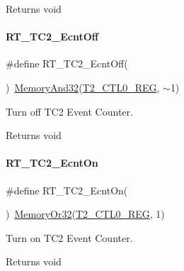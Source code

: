 \begin{DoxyReturn}{Returns}
void 
\end{DoxyReturn}
\mbox{\label{a00047_af77e205baae8e267fda5374c167ab76c}} 
\paragraph{\texorpdfstring{R\+T\+\_\+\+T\+C2\+\_\+\+Ecnt\+Off}{RT\_TC2\_EcntOff}}
{\footnotesize\ttfamily \#define R\+T\+\_\+\+T\+C2\+\_\+\+Ecnt\+Off(\begin{DoxyParamCaption}{ }\end{DoxyParamCaption})~\mbox{\hyperlink{a00020_ad87cedffcaadc51db22594fce55173d4}{Memory\+And32}}(\mbox{\hyperlink{a00020_adadaa0ab1ebbd7ba9b70dfd24c3ed44daf2e9deb36631241181cbf09e8d959475}{T2\+\_\+\+C\+T\+L0\+\_\+\+R\+EG}}, $\sim$1)}



Turn off T\+C2 Event Counter. 

\begin{DoxyReturn}{Returns}
void 
\end{DoxyReturn}
\mbox{\label{a00047_a261544e2cbdbdeee0d22734b29827cd2}} 
\paragraph{\texorpdfstring{R\+T\+\_\+\+T\+C2\+\_\+\+Ecnt\+On}{RT\_TC2\_EcntOn}}
{\footnotesize\ttfamily \#define R\+T\+\_\+\+T\+C2\+\_\+\+Ecnt\+On(\begin{DoxyParamCaption}{ }\end{DoxyParamCaption})~\mbox{\hyperlink{a00020_a27874a97deab7cecdde5ddecf466e31e}{Memory\+Or32}}(\mbox{\hyperlink{a00020_adadaa0ab1ebbd7ba9b70dfd24c3ed44daf2e9deb36631241181cbf09e8d959475}{T2\+\_\+\+C\+T\+L0\+\_\+\+R\+EG}}, 1)}



Turn on T\+C2 Event Counter. 

\begin{DoxyReturn}{Returns}
void 
\end{DoxyReturn}
\mbox{\label{a00047_aa5878518a5c2f7b419de8ed259b54e75}} 
